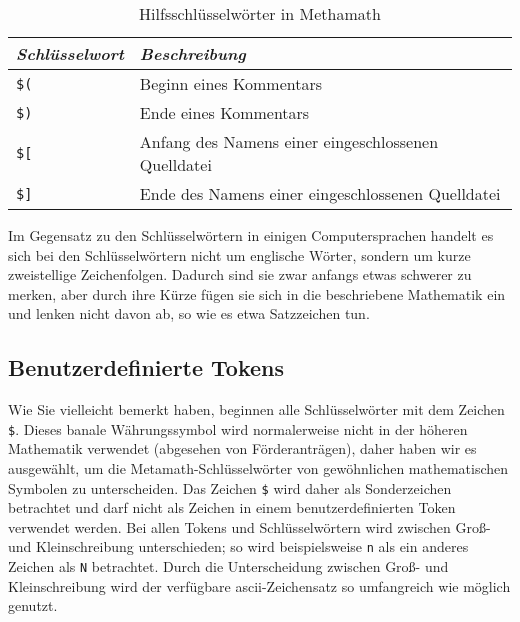 \begin{table}[htp] \caption{Hilfsschlüsselwörter in Methamath} \label{otherkeywords}
\begin{center}
\begin{tabular}{|p{5pc}|l|}
\hline
\em \centering Schlüsselwort&\em Beschreibung\\
\hline
\hline
\centering
   \texttt{\$(}&Beginn eines Kommentars\\
\hline
\centering
   \texttt{\$)}&Ende eines Kommentars\\
\hline
\centering
   \texttt{\$[}&Anfang des Namens einer eingeschlossenen Quelldatei\\
\hline
\centering
   \texttt{\$]}&Ende des Namens einer eingeschlossenen Quelldatei\\
\hline
\end{tabular}
\end{center}
\end{table}


Im Gegensatz zu den Schlüsselwörtern in einigen Computersprachen handelt es sich bei den Schlüsselwörtern nicht um englische Wörter, sondern um kurze zweistellige Zeichenfolgen.  Dadurch sind sie zwar anfangs etwas schwerer zu merken, aber durch ihre Kürze fügen sie sich in die beschriebene Mathematik ein und lenken nicht davon ab, so wie es etwa Satzzeichen tun.


\subsection{Benutzerdefinierte Tokens}\label{dollardollar}

Wie Sie vielleicht bemerkt haben, beginnen alle Schlüsselwörter mit dem Zeichen \texttt{\$}.  Dieses banale Währungssymbol wird normalerweise nicht in der höheren Mathematik verwendet (abgesehen von Förderanträgen), daher haben wir es ausgewählt, um die Metamath-Schlüsselwörter von gewöhnlichen mathematischen Symbolen zu unterscheiden. Das Zeichen \texttt{\$} wird daher als Sonderzeichen betrachtet und darf nicht als Zeichen in einem benutzer\-defi\-nier\-ten Token verwendet werden.  Bei allen Tokens und Schlüsselwörtern wird zwischen Groß- und Kleinschreibung unterschieden; so wird beispiels\-weise \texttt{n} als ein anderes Zeichen als \texttt{N} betrachtet.  Durch die Unterscheidung zwischen Groß- und Kleinschreibung wird der verfügbare {\sc ascii}-Zeichensatz so umfangreich wie möglich genutzt.


